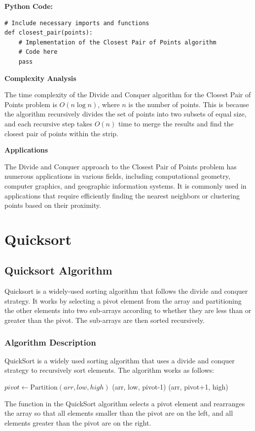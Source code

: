 \documentclass[12pt]{book} %
\begin{document}
\textbf{Python Code:}
\FloatBarrier
\begin{lstlisting}
# Include necessary imports and functions
def closest_pair(points):
    # Implementation of the Closest Pair of Points algorithm
    # Code here
    pass
\end{lstlisting}
\FloatBarrier
\textbf{Complexity Analysis}

The time complexity of the Divide and Conquer algorithm for the Closest Pair of Points problem is \( O(n \log n) \), where \( n \) is the number of points. This is because the algorithm recursively divides the set of points into two subsets of equal size, and each recursive step takes \( O(n) \) time to merge the results and find the closest pair of points within the strip.

\textbf{Applications}

The Divide and Conquer approach to the Closest Pair of Points problem has numerous applications in various fields, including computational geometry, computer graphics, and geographic information systems. It is commonly used in applications that require efficiently finding the nearest neighbors or clustering points based on their proximity.

\section{Quicksort}
\subsection{Quicksort Algorithm}
Quicksort is a widely-used sorting algorithm that follows the divide and conquer strategy. It works by selecting a pivot element from the array and partitioning the other elements into two sub-arrays according to whether they are less than or greater than the pivot. The sub-arrays are then sorted recursively.

\subsubsection{Algorithm Description}
QuickSort is a widely used sorting algorithm that uses a divide and conquer strategy to recursively sort elements. The algorithm works as follows:
\FloatBarrier
\begin{algorithm}
\caption{QuickSort}
\begin{algorithmic}[1]
    \State $pivot \gets \text{Partition}(arr, low, high)$
    \State {}(arr, low, pivot-1)
    \State {}(arr, pivot+1, high)
\EndIf
\EndProcedure
\end{algorithmic}
\end{algorithm}
\FloatBarrier
The  function in the QuickSort algorithm selects a pivot element and rearranges the array so that all elements smaller than the pivot are on the left, and all elements greater than the pivot are on the right.
\end{document}
